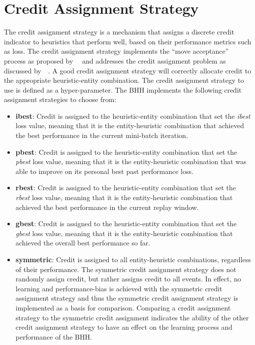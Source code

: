 \section{Credit Assignment Strategy}
\label{sec:bhh:credit_assignment_strategy}

The credit assignment strategy is a mechanism that assigns a discrete credit indicator to heuristics that perform well, based on their performance metrics such as loss. The credit assignment strategy implements the ``move acceptance'' process as proposed by~\citeauthor{ref:ozcan:2006}~\cite{ref:ozcan:2006,ref:ozcan:2008} and addresses the credit assignment problem as discussed by~\citeauthor{ref:burke:2010}~\cite{ref:burke:2010}. A good credit assignment strategy will correctly allocate credit to the appropriate heuristic-entity combination. The credit assignment strategy to use is defined as a hyper-parameter. The \acs{BHH} implements the following credit assignment strategies to choose from:

\begin{itemize}
      \item \textbf{ibest}: Credit is assigned to the heuristic-entity combination that set the \textit{ibest} loss value, meaning that it is the entity-heuristic combination that achieved the best performance in the current mini-batch iteration.

      \item \textbf{pbest}: Credit is assigned to the heuristic-entity combination that set the \textit{pbest} loss value, meaning that it is the entity-heuristic combination that was able to improve on its personal best past performance loss.

      \item \textbf{rbest}: Credit is assigned to the heuristic-entity combination that set the \textit{rbest} loss value, meaning that it is the entity-heuristic combination that achieved the best performance in the current replay window.

      \item \textbf{gbest}: Credit is assigned to the heuristic-entity combination that set the \textit{gbest} loss value, meaning that it is the entity-heuristic combination that achieved the overall best performance so far.

      \item \textbf{symmetric}: Credit is assigned to all entity-heuristic combinations, regardless of their performance. The symmetric credit assignment strategy does not randomly assign credit, but rather assigns credit to all events. In effect, no learning and performance-bias is achieved with the symmetric credit assignment strategy and thus the symmetric credit assignment strategy is implemented as a basis for comparison. Comparing a credit assignment strategy to the symmetric credit assignment indicates the ability of the other credit assignment strategy to have an effect on the learning process and performance of the \acs{BHH}.
\end{itemize}


